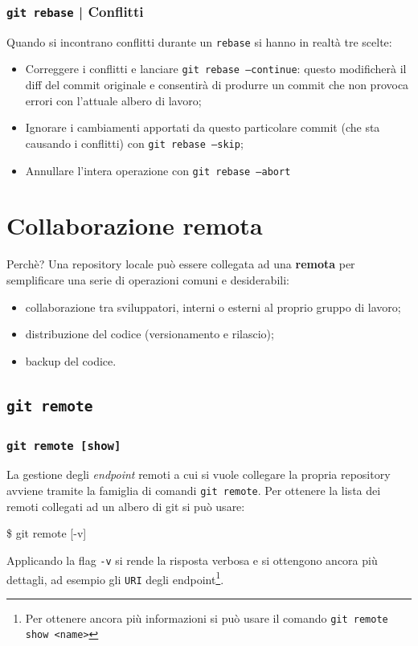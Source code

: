 \documentclass{beamer}
\begin{document}
\begin{frame}
  \label{conflict-end}
  \frametitle{\texttt{git rebase} | Conflitti}
  Quando si incontrano conflitti durante un \texttt{rebase} si hanno in
  realt\`a tre scelte:
  \begin{itemize}
    \item<1-> Correggere i conflitti e lanciare \texttt{git rebase --continue}: questo
      modificher\`a il diff del commit originale e consentir\`a di produrre un
      commit che non provoca errori con l'attuale albero di lavoro;
    \item<2-> Ignorare i cambiamenti apportati da questo particolare commit (che
      sta causando i conflitti) con \texttt{git rebase --skip};
    \item<3-> Annullare l'intera operazione con \texttt{git rebase --abort}
  \end{itemize}
\end{frame}

\section{Collaborazione remota}
\begin{frame}{Perch\`e?}
  Una repository locale pu\`o essere collegata ad una \textbf{remota} per
  semplificare una serie di operazioni comuni e desiderabili:
  \begin{itemize}
    \item<1-> collaborazione tra sviluppatori, interni o esterni al proprio gruppo di lavoro;
    \item<2-> distribuzione del codice (versionamento e rilascio);
    \item<3-> backup del codice.
  \end{itemize}
\end{frame}

\subsection{\texttt{git remote}}
\begin{frame}
  \frametitle{\texttt{git remote [show]}}
  La gestione degli \emph{endpoint} remoti a cui si vuole collegare la propria
  repository avviene tramite la famiglia di comandi \texttt{git remote}.
  Per ottenere la lista dei remoti collegati ad un albero di git si pu\`o usare:
  \begin{semiverbatim}
  \$ git remote [-v]
  \end{semiverbatim}
  Applicando la flag \texttt{-v} si rende la risposta verbosa e si ottengono
  ancora pi\`u dettagli, ad esempio gli \texttt{URI} degli endpoint\footnote{
    Per ottenere ancora pi\`u informazioni si pu\`o usare il comando \texttt{git remote show <name>}
  }.
\end{frame}
\end{document}
